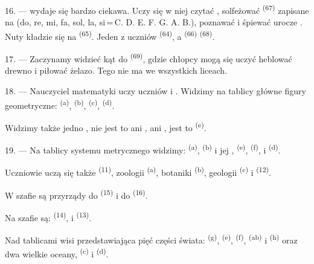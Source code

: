 16. ---  wydaje się bardzo ciekawa. Uczy się w niej czytać
, solfeżować  \textsuperscript{(67)} zapisane na
 (do, re, mi, fa, sol, la, si\,=\,C. D. E. F. G. A. B.), poznawać
 i śpiewać urocze . Nuty kładzie się na 
\textsuperscript{(65)}. Jeden z uczniów  \textsuperscript{(64)},
a  \textsuperscript{(66)} 
\textsuperscript{(68)}.

17. --- Zaczynamy widzieć kąt  do 
\textsuperscript{(69)}, gdzie chłopcy mogą się uczyć heblować drewno i piłować żelazo.
Tego nie ma we wszystkich liceach.

\VUsaut{5.0mm}
\VUsaut{3.6mm}

18. --- Nauczyciel matematyki uczy uczniów  i
. Widzimy na tablicy główne figury geometryczne:
 \textsuperscript{(a)},  \textsuperscript{(b)},
 \textsuperscript{(c)},  \textsuperscript{(d)}.

Widzimy także jedno , nie jest to  ani
, ani , jest to 
\textsuperscript{(e)}.

19. --- Na tablicy systemu metrycznego widzimy:  \textsuperscript{(a)},
 \textsuperscript{(b)} i jej , 
\textsuperscript{(e)},  \textsuperscript{(f)},  i
 \textsuperscript{(d)}.

Uczniowie uczą się także  \textsuperscript{(11)}, zoologii
\textsuperscript{(a)}, botaniki \textsuperscript{(b)}, geologii \textsuperscript{(c)} i
 \textsuperscript{(12)}.

W szafie są przyrządy do  \textsuperscript{(15)} i do 
\textsuperscript{(16)}.

Na szafie są:  \textsuperscript{(14)},  i
 \textsuperscript{(13)}.

Nad tablicami wisi  przedstawiająca pięć części świata:
 \textsuperscript{(g)},  \textsuperscript{(e)},
 \textsuperscript{(f)},  \textsuperscript{(ab)} i
 \textsuperscript{(h)} oraz dwa wielkie oceany, 
\textsuperscript{(c)} i  \textsuperscript{(d)}.
\VUsaut{6.0mm}
\VUfilet{22mm}
